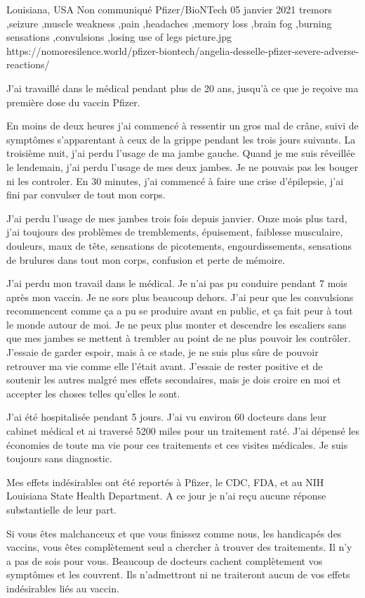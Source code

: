           {Louisiana, USA}
          {Non communiqué}
          {Pfizer/BioNTech}
          {05 janvier 2021}
          {
            tremors
            ,seizure
            ,muscle weakness
            ,pain
            ,headaches
            ,memory loss
            ,brain fog
            ,burning sensations
            ,convulsions
            ,losing use of legs
          }
          {picture.jpg}
          {https://nomoresilence.world/pfizer-biontech/angelia-desselle-pfizer-severe-adverse-reactions/}
          {
          
J'ai travaillé dans le médical pendant plus de 20 ans, jusqu'à ce que je reçoive
ma première dose du vaccin Pfizer.

En moins de deux heures j'ai commencé à ressentir un gros mal de crâne, suivi de
symptômes s'apparentant à ceux de la grippe pendant les trois jours suivants. La
troisième nuit, j'ai perdu l'usage de ma jambe gauche. Quand je me suis
réveillée le lendemain, j'ai perdu l'usage de mes deux jambes. Je ne pouvais pas
les bouger ni les controler. En 30 minutes, j'ai commencé à faire une crise
d'épilepsie, j'ai fini par convulser de tout mon corps.

J'ai perdu l'usage de mes jambes trois fois depuis janvier. Onze mois plus tard,
j'ai toujours des problèmes de tremblements, épuisement, faiblesse musculaire,
douleurs, maux de tête, sensations de picotements, engourdissements, sensations
de brulures dans tout mon corps, confusion et perte de mémoire.

J'ai perdu mon travail dans le médical. Je n'ai pas pu conduire pendant 7 mois
après mon vaccin. Je ne sors plus beaucoup dehors. J'ai peur que les convulsions
recommencent comme ça a pu se produire avant en public, et ça fait peur à tout
le monde autour de moi. Je ne peux plus monter et descendre les escaliers sans
que mes jambes se mettent à trembler au point de ne plus pouvoir les
contrôler. J'essaie de garder espoir, mais à ce stade, je ne suis plus sûre de
pouvoir retrouver ma vie comme elle l'était avant. J'essaie de rester positive
et de soutenir les autres malgré mes effets secondaires, mais je dois croire en
moi et accepter les choses telles qu'elles le sont.

J'ai été hospitalisée pendant 5 jours. J'ai vu environ 60 docteurs dans leur
cabinet médical et ai traversé 5200 miles pour un traitement raté. J'ai dépensé
les économies de toute ma vie pour ces traitements et ces visites médicales. Je
suis toujours sans diagnostic.

Mes effets indésirables ont été reportés à Pfizer, le CDC, FDA, et au NIH
Louisiana State Health Department. A ce jour je n'ai reçu aucune réponse
substantielle de leur part.

Si vous êtes malchanceux et que vous finissez comme nous, les handicapés des
vaccins, vous êtes complètement seul a chercher à trouver des traitements. Il
n'y a pas de sois pour vous. Beaucoup de docteurs cachent complètement vos
symptômes et les couvrent. Ils n'admettront ni ne traiteront aucun de vos effets
indésirables liés au vaccin.

}
